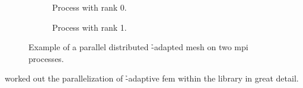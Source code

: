 \begin{figure}
\begin{subfigure}[t]{.35\textwidth}
  \centering
  
  \caption{Process with rank 0.}
\end{subfigure}
\begin{subfigure}[t]{.35\textwidth}
  \centering
  
  \caption{Process with rank 1.}
\end{subfigure}
\begin{minipage}[t]{.28\textwidth}
  \centering
  
\end{minipage}
\caption{Example of a parallel distributed \h-adapted mesh on two \gls{mpi} processes.}
\label{fig:paralleldistribution}
\end{figure}




\textcite{bangerth2012} worked out the parallelization of \h-adaptive \gls{fem} within the \dealii{} library \textcite{dealii920pre} in great detail.